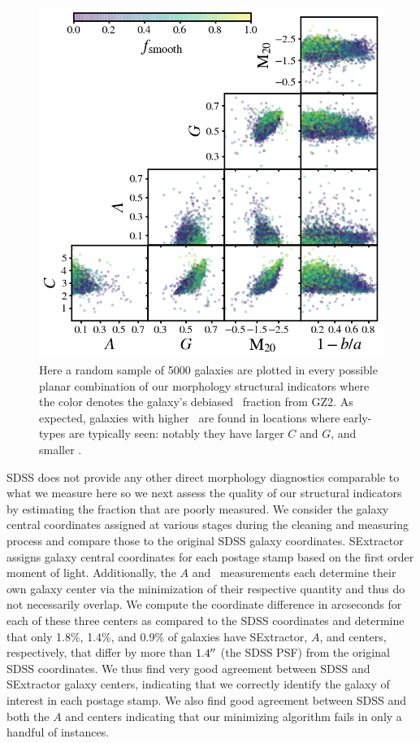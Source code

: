 \begin{figure}
\centering
\includegraphics[width=5in]{Figures/morph_params_random_sample_fsmooth_colored_clean.png}
\caption[Automated morphologies as a function of Galaxy Zoo 2 \fsmooth]{Here a random sample of 5000 galaxies are plotted in every possible planar combination of our morphology structural indicators where the color denotes the galaxy's debiased \fsmooth~fraction from GZ2. As expected, galaxies with higher \fsmooth~are found in locations where early-types are typically seen: notably they have larger $C$ and $G$, and smaller .}
\label{fig: morphs as a fcn of fsmooth}
\end{figure}

SDSS does not provide any other direct morphology diagnostics comparable to what we measure here so we next assess the quality of our structural indicators by estimating the fraction that are poorly measured. We consider the galaxy central coordinates assigned at various stages during the cleaning and measuring process and compare those to the original SDSS galaxy coordinates. SExtractor assigns galaxy central coordinates for each postage stamp based on the first order moment of light. Additionally, the $A$ and ~measurements each determine their own galaxy center via the minimization of their respective quantity and thus do not necessarily overlap. We compute the coordinate difference in arcseconds for each of these three centers as compared to the SDSS coordinates and determine that only 1.8\%, 1.4\%, and 0.9\% of galaxies have SExtractor, $A$, and  centers, respectively, that differ by more than $1.4\mbox{$^{\prime\prime}$}$ (the SDSS PSF) from the original SDSS coordinates. We thus find very good agreement between SDSS and SExtractor galaxy centers, indicating that we correctly identify the galaxy of interest in each postage stamp. We also find good agreement between SDSS and both the $A$ and  centers indicating that our minimizing algorithm fails in only a handful of instances.  


